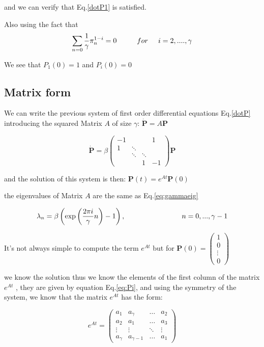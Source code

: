 \documentclass[a4paper,12pt,twoside]{article}
\begin{document}
and we can verify that Eq.\eqref{dotP1} is satisfied.

Also using the fact that 
 \begin{equation}
\sum_{n=0}\frac{1}{\gamma}\pi_n^{1-i} =0 \hspace{1cm} for \hspace{0.5cm} i=2,....,\gamma
\end{equation}

We see that $P_1(0)=1$ and $P_i(0)=0$
\subsection{Matrix form}
We can write the previous system of first order differential equations Eq.\eqref{dotP} introducing the squared Matrix $A$ of size $\gamma$:  $\dot{ \textbf{P}}=A\textbf{P}$

 \begin{equation}
\dot{ \textbf{P}}=\beta
\begin{pmatrix}
-1&           & &1 \\
  1&\ddots& &   \\
    &\ddots&\ddots &   \\
      & &1& -1  
\end{pmatrix}
\textbf{P}
 \end{equation}
 
 and the solution of this system is then:
 $\textbf{P}(t)=e^{At}\textbf{P}(0)$
 
 the eigenvalues of Matrix $A$ are the same as Eq.\eqref{eq:gammaeig}
 
 \begin{equation}
 \label{eq:gammaeig1}
 \lambda_n=\beta\left(\exp\left(\frac{2\pi i}{\gamma}n\right)-1\right), \hspace{2.8cm}  n=0,..., \gamma-1
 \end{equation}
 
 It's not always simple to compute the term $e^{At}$ but for $\textbf{P}(0)=
 \begin{pmatrix}
 1 \\
0  \\
 \vdots   \\
0
 \end{pmatrix}$

we know the solution thus we know the elements of the first column of the matrix  $e^{At}$ , they are given by equation Eq.\eqref{eq:Pi}, and using the symmetry of the system, we know that the matrix $e^{At}$  has the form:

 \begin{equation}
e^{At}=
\begin{pmatrix}
a_1 & a_\gamma& \dots&a_2\\
a_2&  a_1 & \dots & a_3\\
\vdots& \vdots&\ddots  &\vdots  \\
a_\gamma & a_{\gamma-1}&\dots&a_1
\end{pmatrix}
\end{equation}
\end{document}

